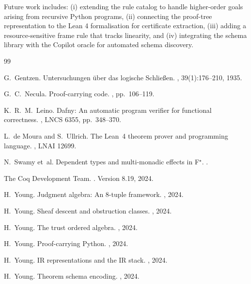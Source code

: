 \documentclass[11pt]{article}
\begin{document}
Future work includes:
(i) extending the rule catalog to handle higher-order
goals arising from recursive Python programs,
(ii) connecting the proof-tree representation to the Lean 4
formalisation for certificate extraction,
(iii) adding a resource-sensitive frame rule that tracks linearity, and
(iv) integrating the schema library with the Copilot oracle for
automated schema discovery.

\begin{thebibliography}{99}

G.~Gentzen.
\newblock Untersuchungen \"uber das logische Schlie{\ss}en.
, 39(1):176--210, 1935.

G.~C.~Necula.
\newblock Proof-carrying code.
, pp.~106--119.

K.~R.~M.~Leino.
\newblock Dafny: An automatic program verifier for functional correctness.
, LNCS 6355, pp.~348--370.

L.~de Moura and S.~Ullrich.
\newblock The {Lean~4} theorem prover and programming language.
, LNAI 12699.

N.~Swamy et~al.
\newblock Dependent types and multi-monadic effects in {F$^{\star}$}.
.

The Coq Development Team.
.
\newblock Version 8.19, 2024.

H.~Young.
\newblock Judgment algebra: An 8-tuple framework.
, 2024.

H.~Young.
\newblock Sheaf descent and obstruction classes.
, 2024.

H.~Young.
\newblock The trust ordered algebra.
, 2024.

H.~Young.
\newblock Proof-carrying Python.
, 2024.

H.~Young.
\newblock IR representations and the IR stack.
, 2024.

H.~Young.
\newblock Theorem schema encoding.
, 2024.

\end{thebibliography}
\end{document}
